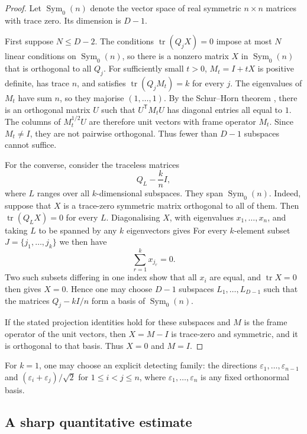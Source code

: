 \documentclass[11pt]{article}
\theoremstyle{definition}
\theoremstyle{remark}
\DeclareMathOperator{\tr}{tr}
\newcommand{\T}{\mathsf{T}}
\begin{document}
\begin{proof}
Let $\operatorname{Sym}_0(n)$ denote the vector space of real symmetric $n\times n$ matrices with trace zero. Its dimension is $D-1$.

First suppose $N\le D-2$. The conditions $\tr(Q_jX)=0$ impose at most $N$ linear
conditions on $\operatorname{Sym}_0(n)$, so there is a nonzero matrix $X$ in $\operatorname{Sym}_0(n)$ that is orthogonal to all $Q_j$. For sufficiently small $t>0$,
$M_t=I+tX$ is positive definite, has trace $n$, and satisfies
$\tr(Q_jM_t)=k$ for every $j$. The eigenvalues of $M_t$ have sum $n$, so they majorise
$(1,\ldots,1)$. By the Schur--Horn theorem \cite{AHorn,HornJohnson}, there is an orthogonal
matrix $U$ such that $U^{\T}M_tU$ has diagonal entries all equal to $1$. The columns of
$M_t^{1/2}U$ are therefore unit vectors with frame operator $M_t$. Since $M_t\ne I$, they
are not pairwise orthogonal. Thus fewer than $D-1$ subspaces cannot suffice.

For the converse, consider the traceless matrices
\[
Q_L-\frac{k}{n}I,
\]
where $L$ ranges over all $k$-dimensional subspaces. They span $\operatorname{Sym}_0(n)$.
Indeed, suppose that $X$ is a trace-zero symmetric matrix orthogonal to all of them. Then
$\tr(Q_LX)=0$ for every $L$. Diagonalising $X$, with eigenvalues
$x_1,\ldots,x_n$, and taking $L$ to be spanned by any $k$ eigenvectors gives
For every $k$-element subset $J=\{j_1,\ldots,j_k\}$ we then have
\[
\sum_{r=1}^{k}x_{j_r}=0.
\]
Two such subsets differing in one index show that all $x_i$ are equal, and $\tr X=0$ then gives $X=0$. Hence one may choose $D-1$ subspaces
$L_1,\ldots,L_{D-1}$ such that the matrices
$Q_j-kI/n$ form a basis of $\operatorname{Sym}_0(n)$.

If the stated projection identities hold for these subspaces and $M$ is the frame operator
of the unit vectors, then $X=M-I$ is trace-zero and symmetric, and it is orthogonal to
that basis. Thus $X=0$ and $M=I$.
\end{proof}

For $k=1$, one may choose an explicit detecting family: the directions
$\varepsilon_1,\ldots,\varepsilon_{n-1}$ and
$(\varepsilon_i+\varepsilon_j)/\sqrt2$ for $1\le i<j\le n$, where
$\varepsilon_1,\ldots,\varepsilon_n$ is any fixed orthonormal basis.

\subsection{A sharp quantitative estimate}
\end{document}
